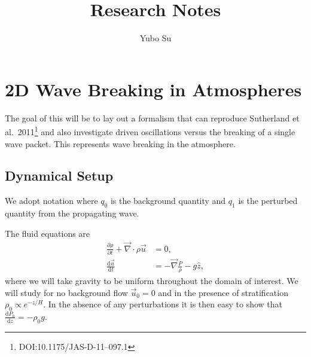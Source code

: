 \documentclass[11pt,
        usenames, %
        dvipsnames %
    ]{report}
\newcommand*{\rd}[2]{\frac{\mathrm{d}#1}{\mathrm{d}#2}}
\newcommand*{\pd}[2]{\frac{\partial#1}{\partial#2}}
\begin{document}
\def\Snospace~{\S{}} %
\renewcommand*{\sectionautorefname}{\Snospace}
\renewcommand*{\appendixautorefname}{\Snospace}
\renewcommand*{\figureautorefname}{Fig.}
\renewcommand*{\equationautorefname}{Eq.}
\renewcommand*{\tableautorefname}{Tab.}

\onehalfspacing

\pagestyle{fancy}
\cfoot{\thepage/\pageref{LastPage}}

\title{Research Notes}
\author{Yubo Su}

\maketitle

\tableofcontents

\newpage

\chapter{2D Wave Breaking in Atmospheres}

The goal of this will be to lay out a formalism that can reproduce Sutherland et
al.~2011\footnote{DOI:10.1175/JAS-D-11--097.1} and also investigate driven
oscillations versus the breaking of a single wave packet. This represents wave
breaking in the atmosphere.

\section{Dynamical Setup}

We adopt notation where $q_0$ is the background quantity and $q_1$ is the
perturbed quantity from the propagating wave.

The fluid equations are
\begin{subequations}\label{se:fl_eq}
    \begin{align}
        \pd{\rho}{t} + \vec{\nabla} \cdot \rho \vec{u} &= 0,
            \label{eq:fl_eq.cont}\\
        \rd{\vec{u}}{t} &= -\vec{\nabla}\frac{P}{\rho} - g\hat{z},
            \label{eq:fl_eq.mom}
    \end{align}
\end{subequations}
where we will take gravity to be uniform throughout the domain of interest. We
will study for no background flow $\vec{u}_0 = 0$ and in the presence of
stratification $\rho_0 \propto e^{-z/H}$. In the absence of any perturbations it
is then easy to show that $\rd{P_0}{z} = -\rho_0 g$.
\end{document}
